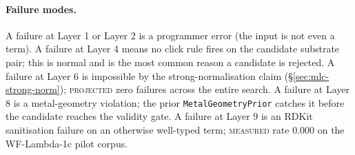 \paragraph{Failure modes.}
A failure at Layer 1 or Layer 2 is a programmer error (the
input is not even a term).
A failure at Layer 4 means no click rule fires on the candidate
substrate pair; this is normal and is the most common reason a
candidate is rejected.
A failure at Layer 6 is impossible by the strong-normalisation
claim (\S\ref{sec:mlc-strong-norm}); \textsc{projected} zero
failures across the entire search.
A failure at Layer 8 is a metal-geometry violation; the prior
\texttt{MetalGeometryPrior} catches it before the candidate
reaches the validity gate.
A failure at Layer 9 is an RDKit sanitisation failure on an
otherwise well-typed term; \textsc{measured} rate 0.000 on
the WF-Lambda-1c pilot corpus.

